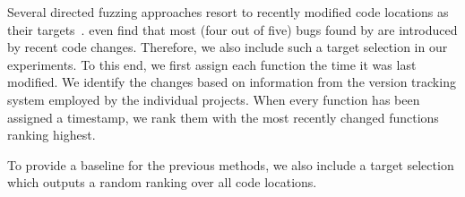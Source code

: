 \cstart
{}
Several directed fuzzing approaches resort to recently modified code locations as their targets~\cite{BoePhaNguRoy17, ZhuBöh21, CanMatGraKal+22, PenLiLiuXu+19}. \citet{ZhuBöh21} even find that most (four out of five) bugs found by \ossfuzz{} are introduced by recent code changes. Therefore, we also include such a target selection in our experiments. To this end, we first assign each function the time it was last modified. We identify the changes based on information from the version tracking system employed by the individual projects. When every function has been assigned a timestamp, we rank them with the most recently changed functions ranking highest.
\cend

To provide a baseline for the previous methods, we also include a target selection which outputs a random ranking over all code locations.